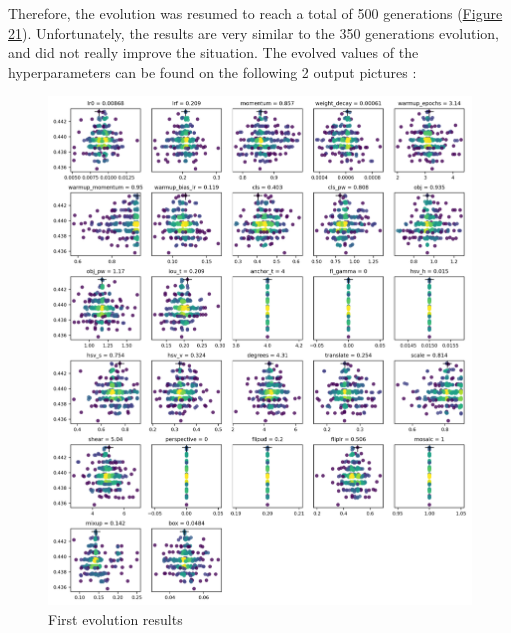 \documentclass{article}
\begin{document}
\bigskip

Therefore, the evolution was resumed to reach a total of 500 generations (\hyperref[Figure 21]{Figure 21}). Unfortunately, the results are very similar to the 350 generations evolution, and did not really improve the situation. The evolved values of the hyperparameters can be found on the following 2 output pictures :

\begin{figure}[!ht]
  \centering
  \includegraphics[scale=0.9]{evolution/evol1.png}
  \caption{First evolution results}
  \label{Figure 20}
\end{figure}

\newpage
\end{document}

